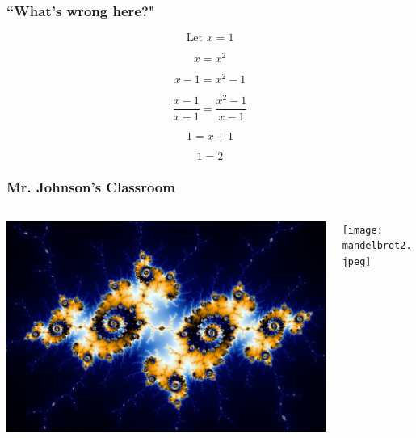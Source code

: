 \documentclass{beamer}
\theoremstyle{mystyle}
\begin{document}
\begin{frame}
\frametitle{``What's wrong here?"}

\[\text{Let } x = 1\]

\pause

\[x = x^2\]

\pause

\[x - 1 = x^2 - 1\]

\pause

\[\frac{x - 1}{x - 1} = \frac{x^2 - 1}{x - 1}\]

\pause

\[ 1 = x+1\]

\pause

\[1 = 2\]
\end{frame}


\begin{frame}
\frametitle{Mr. Johnson's Classroom }

\vspace{0.1in}
\begin{columns}
	\begin{column}{0.48\textwidth}
		\includegraphics[scale=0.19]{mandelbrot.png}
	\end{column}
	\begin{column}{0.48\textwidth}
		\texttt{[image: mandelbrot2.jpeg]}
	\end{column}
\end{columns}


\end{frame}
\end{document}
